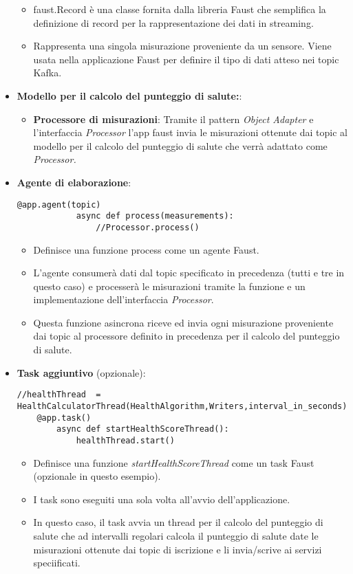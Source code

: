 \begin{itemize}
\begin{itemize}
        \item faust.Record è una classe fornita dalla libreria Faust che semplifica la definizione di record per la rappresentazione dei dati in streaming.
        \item Rappresenta una singola misurazione proveniente da un sensore. Viene usata nella applicazione Faust per definire il tipo di dati atteso nei topic Kafka.
    \end{itemize}
    \item \textbf{Modello per il calcolo del punteggio di salute:}:
    \begin{itemize}
        \item \textbf{Processore di misurazioni}: 
        Tramite il pattern \textit{Object Adapter} e l'interfaccia \textit{Processor} l'app faust invia le misurazioni ottenute dai topic al modello per il calcolo del punteggio di salute che verrà adattato come \textit{Processor.}
    \end{itemize}
    \item \textbf{Agente di elaborazione}: 
    \begin{lstlisting}[style=code]
    @app.agent(topic)
            async def process(measurements):
                //Processor.process()
    \end{lstlisting}  
    \begin{itemize}
        \item Definisce una funzione process come un agente Faust.
        \item L'agente consumerà dati dal topic specificato in precedenza (tutti e tre in questo caso) e processerà le misurazioni tramite la funzione e un implementazione dell'interfaccia \textit{Processor}.
        \item Questa funzione asincrona riceve ed invia ogni misurazione proveniente dai topic al processore definito in precedenza per il calcolo del punteggio di salute.
    \end{itemize}
    \item \textbf{Task aggiuntivo} (opzionale): 
    \begin{lstlisting}[style=code]
    //healthThread  = HealthCalculatorThread(HealthAlgorithm,Writers,interval_in_seconds)
    @app.task()
        async def startHealthScoreThread():
            healthThread.start()
        \end{lstlisting}  
    \begin{itemize}
        \item Definisce una funzione \textit{startHealthScoreThread} come un task Faust (opzionale in questo esempio).
        \item I task sono eseguiti una sola volta all'avvio dell'applicazione.
        \item In questo caso, il task avvia un thread per il calcolo del punteggio di salute che ad intervalli regolari calcola il punteggio di salute date le misurazioni ottenute dai topic di iscrizione e li invia/scrive ai servizi speciificati.
    \end{itemize}
\end{itemize}
